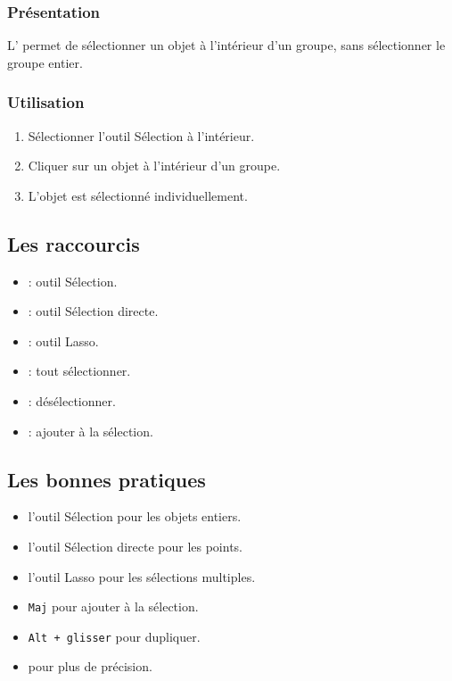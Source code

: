 \subsubsection{Présentation}

L' permet de sélectionner un objet à l'intérieur d'un groupe, sans sélectionner le groupe entier.

\subsubsection{Utilisation}

\begin{enumerate}
    \item Sélectionner l'outil Sélection à l'intérieur.
    \item Cliquer sur un objet à l'intérieur d'un groupe.
    \item L'objet est sélectionné individuellement.
\end{enumerate}

\subsection{Les raccourcis}

\begin{itemize}
    \item {} : outil Sélection.
    \item {} : outil Sélection directe.
    \item {} : outil Lasso.
    \item {} : tout sélectionner.
    \item {} : désélectionner.
    \item {} : ajouter à la sélection.
\end{itemize}

\subsection{Les bonnes pratiques}

\begin{itemize}
    \item {} l'outil Sélection pour les objets entiers.
    \item {} l'outil Sélection directe pour les points.
    \item {} l'outil Lasso pour les sélections multiples.
    \item {} \texttt{Maj} pour ajouter à la sélection.
    \item {} \texttt{Alt + glisser} pour dupliquer.
    \item {} pour plus de précision.
\end{itemize}

